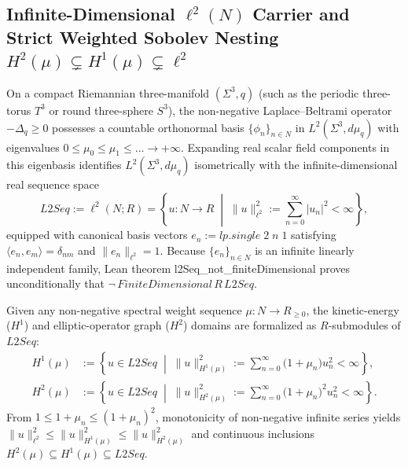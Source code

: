 \documentclass[american,11pt,letterpaper]{article}
\def\mathbb#1{#1}%
\def\mathrm#1{#1}%
\def\texttt#1{#1}%
\begin{document}
\subsection{Infinite-Dimensional $\ell^2(\mathbb{N})$ Carrier and Strict Weighted Sobolev Nesting $H^2(\mu) \subsetneq H^1(\mu) \subsetneq \ell^2$}

On a compact Riemannian three-manifold $(\Sigma^3, q)$ (such as the periodic three-torus $\mathbb{T}^3$ or round three-sphere $S^3$), the non-negative Laplace--Beltrami operator $-\Delta_q \ge 0$ possesses a countable orthonormal basis $\{\phi_n\}_{n\in\mathbb{N}}$ in $L^2(\Sigma^3, d\mu_q)$ with eigenvalues $0 \le \mu_0 \le \mu_1 \le \dots \to +\infty$. Expanding real scalar field components in this eigenbasis identifies $L^2(\Sigma^3, d\mu_q)$ isometrically with the infinite-dimensional real sequence space
\begin{equation}
\mathrm{L2Seq} := \ell^2(\mathbb{N}; \mathbb{R})
= \left\{ u : \mathbb{N} \to \mathbb{R} \;\middle|\; \|u\|_{\ell^2}^2 := \sum_{n=0}^\infty |u_n|^2 < \infty \right\},
\label{eq:L2Seq_def}
\end{equation}
equipped with canonical basis vectors $e_n := \mathrm{lp.single}\;2\;n\;1$ satisfying $\langle e_n, e_m\rangle = \delta_{nm}$ and $\|e_n\|_{\ell^2} = 1$. Because $\{e_n\}_{n\in\mathbb{N}}$ is an infinite linearly independent family, Lean theorem \texttt{l2\allowbreak{}Seq\_\allowbreak{}not\_\allowbreak{}finite\allowbreak{}Dimensional} proves unconditionally that $\neg\,\mathrm{FiniteDimensional}\,\mathbb{R}\,\mathrm{L2Seq}$.

Given any non-negative spectral weight sequence $\mu : \mathbb{N} \to \mathbb{R}_{\ge 0}$, the kinetic-energy ($H^1$) and elliptic-operator graph ($H^2$) domains are formalized as $\mathbb{R}$-submodules of $\mathrm{L2Seq}$:
\begin{align}
H^1(\mu) &:= \left\{ u \in \mathrm{L2Seq} \;\middle|\; \|u\|_{H^1(\mu)}^2 := \sum_{n=0}^\infty \bigl(1 + \mu_n\bigr) u_n^2 < \infty \right\}, \label{eq:H1_mu_def}\\
H^2(\mu) &:= \left\{ u \in \mathrm{L2Seq} \;\middle|\; \|u\|_{H^2(\mu)}^2 := \sum_{n=0}^\infty \bigl(1 + \mu_n\bigr)^2 u_n^2 < \infty \right\}. \label{eq:H2_mu_def}
\end{align}
From $1 \le 1 + \mu_n \le (1 + \mu_n)^2$, monotonicity of non-negative infinite series yields $\|u\|_{\ell^2}^2 \le \|u\|_{H^1(\mu)}^2 \le \|u\|_{H^2(\mu)}^2$ and continuous inclusions $H^2(\mu) \subseteq H^1(\mu) \subseteq \mathrm{L2Seq}$.
\end{document}
